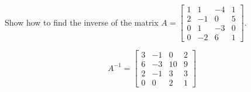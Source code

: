 
\begin{exerciseStatement}


Show how to find the inverse of the matrix \(A= \left[\begin{array}{cccc}
1 & 1 & -4 & 1 \\
2 & -1 & 0 & 5 \\
0 & 1 & -3 & 0 \\
0 & -2 & 6 & 1
\end{array}\right] \).


\end{exerciseStatement}
    
\begin{exerciseAnswer} 
\[A^{-1}= \left[\begin{array}{cccc}
3 & -1 & 0 & 2 \\
6 & -3 & 10 & 9 \\
2 & -1 & 3 & 3 \\
0 & 0 & 2 & 1
\end{array}\right] \]
\end{exerciseAnswer}
    
